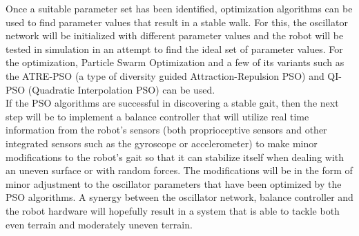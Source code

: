 \documentclass[12pt,twoside]{article}
\theoremstyle{plain}
\theoremstyle{definition}
\theoremstyle{remark}
\newcommand{\forceindent}{\leavevmode{\parindent=2em\indent}}
\begin{document}
\forceindent Once a suitable parameter set has been identified, optimization algorithms can be used to find parameter values that result in a stable walk. For this, the oscillator network will be initialized with different parameter values and the robot will be tested in simulation in an attempt to find the ideal set of parameter values. For the optimization, Particle Swarm Optimization \cite{Eberhart1995, Shi1998, Kennedy2002} and a few of its variants such as the ATRE-PSO (a type of diversity guided Attraction-Repulsion PSO) \cite{Pant2007a} and QI-PSO (Quadratic Interpolation PSO) \cite{Pant2007} can be used.\\
\forceindent If the PSO algorithms are successful in discovering a stable gait, then the next step will be to implement a balance controller that will utilize real time information from the robot's sensors (both proprioceptive sensors and other integrated sensors such as the gyroscope or accelerometer) to make minor modifications to the robot's gait so that it can stabilize itself when dealing with an uneven surface or with random forces. The modifications will be in the form of minor adjustment to the oscillator parameters that have been optimized by the PSO algorithms. A synergy between the oscillator network, balance controller and the robot hardware will hopefully result in a system that is able to tackle both even terrain and moderately uneven terrain. 
\end{document}
